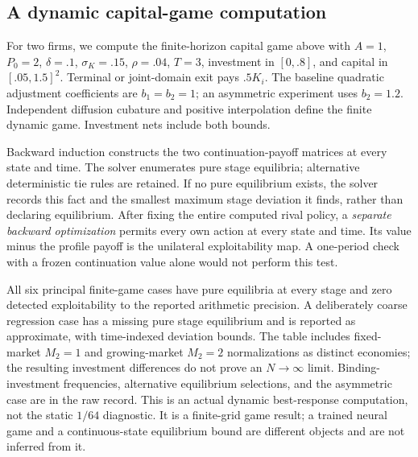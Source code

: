 \subsection{A dynamic capital-game computation}\label{sec:dynamic-computation}
For two firms, we compute the finite-horizon capital game above with $A=1$, $P_0=2$, $\delta=.1$, $\sigma_K=.15$, $\rho=.04$, $T=3$, investment in $[0,.8]$, and capital in $[.05,1.5]^2$. Terminal or joint-domain exit pays $.5K_i$. The baseline quadratic adjustment coefficients are $b_1=b_2=1$; an asymmetric experiment uses $b_2=1.2$. Independent diffusion cubature and positive interpolation define the finite dynamic game. Investment nets include both bounds.

Backward induction constructs the two continuation-payoff matrices at every state and time. The solver enumerates pure stage equilibria; alternative deterministic tie rules are retained. If no pure equilibrium exists, the solver records this fact and the smallest maximum stage deviation it finds, rather than declaring equilibrium. After fixing the entire computed rival policy, a \emph{separate backward optimization} permits every own action at every state and time. Its value minus the profile payoff is the unilateral exploitability map. A one-period check with a frozen continuation value alone would not perform this test.

All six principal finite-game cases have pure equilibria at every stage and zero detected exploitability to the reported arithmetic precision. A deliberately coarse regression case has a missing pure stage equilibrium and is reported as approximate, with time-indexed deviation bounds. The table includes fixed-market $M_2=1$ and growing-market $M_2=2$ normalizations as distinct economies; the resulting investment differences do not prove an $N\to\infty$ limit. Binding-investment frequencies, alternative equilibrium selections, and the asymmetric case are in the raw record. This is an actual dynamic best-response computation, not the static $1/64$ diagnostic. It is a finite-grid game result; a trained neural game and a continuous-state equilibrium bound are different objects and are not inferred from it.
